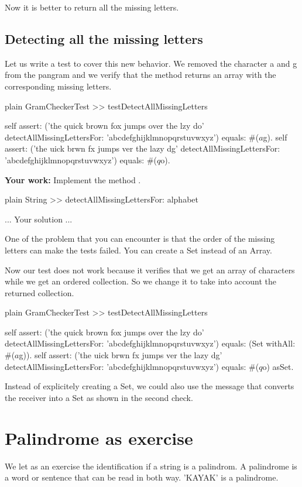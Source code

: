\documentclass[10pt,twoside,english]{_support/latex/sbabook/sbabook}
\begin{document}
Now it is better to return all the missing letters. 
\subsection{Detecting all the missing letters}
Let us write a test to cover this new behavior. We removed the character a and g from the pangram and we verify that the method returns an array with the corresponding missing letters. 

\begin{displaycode}{plain}
GramCheckerTest >> testDetectAllMissingLetters

	self assert: ('the quick brown fox jumps over the lzy do' 
		detectAllMissingLettersFor: 'abcdefghijklmnopqrstuvwxyz') equals: #($a $g).
	self assert: ('the uick brwn fx jumps ver the lazy dg' 
		detectAllMissingLettersFor: 'abcdefghijklmnopqrstuvwxyz') equals: #($q $o).
\end{displaycode}

\textbf{Your work:} Implement the method .

\begin{displaycode}{plain}
String >> detectAllMissingLettersFor: alphabet
	
	... Your solution ...
\end{displaycode}

One of the problem that you can encounter is that the order of the missing letters can make the tests failed. You can create a Set instead of an Array. 

Now our test does not work because it  verifies that we get an array of characters while we get an ordered collection. So we change it to take into account the returned collection. 

\begin{displaycode}{plain}
GramCheckerTest >> testDetectAllMissingLetters

	self assert: ('the quick brown fox jumps over the lzy do' 
		detectAllMissingLettersFor: 'abcdefghijklmnopqrstuvwxyz') equals: (Set withAll: #($a $g)).
	self assert: ('the uick brwn fx jumps ver the lazy dg' 
		detectAllMissingLettersFor: 'abcdefghijklmnopqrstuvwxyz') equals: #($q $o) asSet.
\end{displaycode}

Instead of explicitely creating a Set, we could also use the message  that converts the receiver into a Set as shown in the second check. 
\section{Palindrome as exercise}
We let as an exercise the identification if a string is a palindrom. 
A palindrome is a word or sentence that can be read in both way. 'KAYAK' is a palindrome. 
\end{document}

